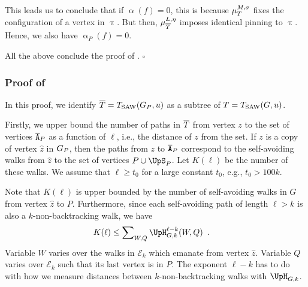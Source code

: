 \documentclass[11pt,reqno]{amsart}
\numberwithin{equation}{section}
\newcommand{\cE}{{\mathcal{E}}}
\newcommand{\applegreen}[1]{ {\color{applegreen}#1}}
\newcommand{\amethyst}[1]{{\color{amethyst}#1} }
\newcommand{\blue}[1]{{\color{blue}#1}}
\newcommand{\bluepigment}[1]{{\color{blue(pigment)}#1}}
\newcommand{\cadmiumgreen}[1]{{\color{cadmiumgreen}#1}}
\newcommand{\cadmiumorange}[1]{{\color{cadmiumorange}#1}}
\newcommand{\deeppink}[1]{{\color{deeppink}#1}}
\newcommand{\goldenbrown}[1]{{\color{goldenbrown}#1}}
\newcommand{\iris}[1]{{\color{iris}#1}}
\newcommand{\red}[1]{{\color{red}#1}}
\newcommand{\ExtV}{\iris{\cE}}
\newcommand{\Tsaw}{T_{\rm SAW}}
\newcommand{\NBMatrix}{\cadmiumgreen{\UpH}_{G,\kk}}
\renewcommand{\applegreen}[1]{#1}
\renewcommand{\amethyst}[1]{#1}
\renewcommand{\blue}[1]{#1}
\renewcommand{\bluepigment}[1]{#1}
\renewcommand{\cadmiumgreen}[1]{#1}
\renewcommand{\cadmiumorange}[1]{#1}
\renewcommand{\deeppink}[1]{#1}
\renewcommand{\goldenbrown}[1]{#1}
\renewcommand{\iris}[1]{#1}
\renewcommand{\red}[1]{#1}
\newcommand{\kf}{\deeppink{f}}
\newcommand{\kK}{\bluepigment{K}}
\newcommand{\kk}{\bluepigment{k}}
\newcommand{\kL}{\cadmiumorange{L}}
\newcommand{\kell}{{\color{green(pigment)}\ell}}%
\newcommand{\kP}{\goldenbrown{P}}
\newcommand{\kQ}{\amethyst{Q}}
\newcommand{\kt}{\cadmiumorange{t}}
\newcommand{\ku}{\red{u}}
\newcommand{\kW}{\blue{W}}
\newcommand{\kz}{\cadmiumgreen{z}}
\renewcommand{\kf}{f}
\renewcommand{\kK}{K}
\renewcommand{\kk}{k}
\renewcommand{\kL}{L}
\renewcommand{\kell}{\ell}
\renewcommand{\kP}{P}
\renewcommand{\kQ}{Q}
\renewcommand{\kt}{t}
\renewcommand{\ku}{u}
\renewcommand{\kW}{W}
\renewcommand{\kz}{z}
\newcommand{\infweight}{\upalpha}
\begin{document}
This leads us to conclude that if $\infweight(\kf)=0$, this is because $\mu^{M,\sigma}_{\SMTu}$ fixes the configuration
of a vertex in $\uppi$. But then, $\mu^{\kL,\eta}_{\SMTPu}$ imposes identical pinning to $\uppi$. Hence, we also have 
$\infweight_{\kP}(\kf)=0$. 

All the above conclude the proof of . \hfill $\square$







\subsubsection{Proof of }
In this proof, we identify $\SMTPu=\Tsaw(\gext{G}{\kP},\ku)$ as a subtree of $\SMTu=\Tsaw(G,\ku)$. 



Firstly, we upper bound the number of paths in $\SMTPu$ from vertex $\kz$ to the set of vertices  $\cpTP$ as a function of 
$\kell$, i.e., the distance of $\kz$ from the set. If $\kz$ is a copy of vertex $\widehat{\kz}$ in $\gext{G}{\kP}$, then the paths from 
$\kz$ to  $\cpTP$ correspond to the self-avoiding walks from $\widehat{\kz}$ to the set of vertices $\kP\cup \ssplit_{\kP}$. 
Let $\kK(\kell)$ be the number of these walks. We assume that $\kell\geq \kt_0$  for a large constant $\kt_0$, e.g., $\kt_0>100\kk$. 
%



Note that $\kK(\kell)$ is upper bounded by the number of self-avoiding walks in $G$ from vertex $\widehat{\kz}$ to $\kP$. 
%
Furthermore, since each self-avoiding path of length $\kell>\kk$ is also a $\kk$-non-backtracking walk, we have 
\begin{align}\label{eq:KEllVsNBMGPEntry}
\kK(\kell) &\leq\sum\nolimits_{\kW,\kQ}\NBMatrix^{\kell-\kk}(\kW,\kQ)  
\enspace.
\end{align}
Variable $\kW$ varies over the walks in $\ExtV_{\kk}$ which emanate from vertex $\widehat{\kz}$.   Variable $\kQ$ varies over 
$\ExtV_{\kk}$ such that  its  last vertex is in $\kP$.  The exponent $\kell-\kk$ has to do with how we measure distances 
between $\kk$-non-backtracking walks with $\NBMatrix$.
 

 
 
\end{document}

